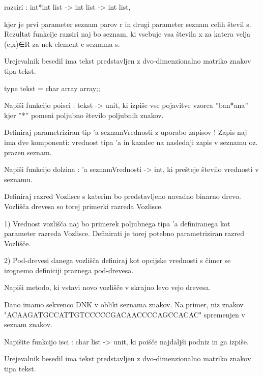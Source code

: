 \begin{ex}
razsiri : int*int list -> int list -> int list,

kjer je prvi parameter seznam parov r in drugi parameter seznam celih \v stevil s. Rezultat funkcije razsiri naj bo seznam, ki vsebuje vsa \v stevila x za katera velja (e,x)∈R za nek element e seznama s. 


\end{ex} \begin{ex}
Urejevalnik besedil ima tekst predstavljen z dvo-dimenzionalno matriko znakov tipa tekst. 

type tekst = char array array;;

Napi\v si funkcijo poisci : tekst -> unit, ki izpi\v se vse pojavitve vzorca ''ban*ana'' kjer ''*'' pomeni poljubno \v stevilo poljubnih znakov.


\end{ex} \begin{ex}
Definiraj parametriziran tip 'a seznamVrednosti z uporabo zapisov ! Zapis naj ima dve komponenti: vrednost tipa 'a in kazalec na naslednji zapis v seznamu oz. prazen seznam.

Napi\v si funkcijo dolzina : 'a seznamVrednosti -> int, ki pre\v steje \v stevilo vrednosti v seznamu. 


\end{ex} \begin{ex}
Definiraj razred Vozlisce s katerim bo predstavljeno navadno binarno drevo.  Vozli\v s\v ca drevesa so torej primerki razreda Vozlisce.

    1) Vrednost vozli\v s\v ca naj bo primerek poljubnega tipa 'a definiranega kot parameter razreda Vozlisce. Definirati je torej potebno parametriziran razred Vozli\v s\v ce.
    
    2) Pod-drevesi danega vozli\v s\v ca definiraj kot opcijske vrednosti s \v cimer se izognemo definiciji praznega pod-drevesa. 

Napi\v si metodo, ki vstavi novo vozli\v s\v ce v skrajno levo vejo drevesa.


\end{ex} \begin{ex}
Dano imamo sekvenco DNK v obliki seznama znakov.  Na primer, niz znakov   "ACAAGATGCCATTGTCCCCCGACAACCCCAGCCACAC" spremenjen v seznam znakov. 

Napi\v site funkcijo isci : char list -> unit, ki poi\v s\v ce najdalj\v si podniz in ga izpi\v se. 


\end{ex} \begin{ex}
Urejevalnik besedil ima tekst predstavljen z dvo-dimenzionalno matriko znakov tipa tekst. 


\end{ex}

